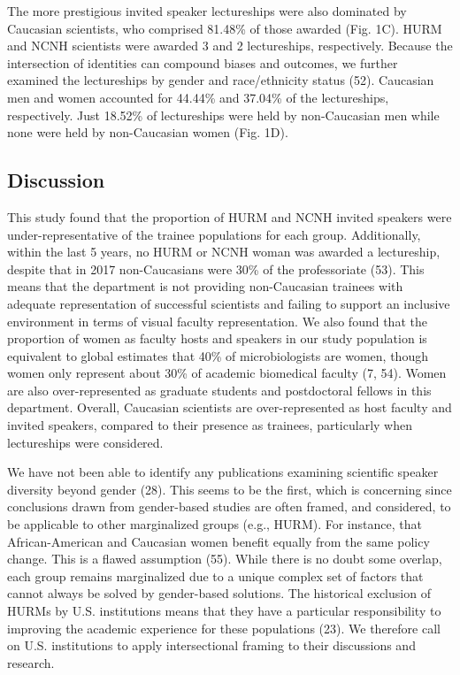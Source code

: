\documentclass[10pt,]{article}
\begin{document}
The more prestigious invited speaker lectureships were also dominated by
Caucasian scientists, who comprised 81.48\% of those awarded (Fig. 1C).
HURM and NCNH scientists were awarded 3 and 2 lectureships,
respectively. Because the intersection of identities can compound biases
and outcomes, we further examined the lectureships by gender and
race/ethnicity status (52). Caucasian men and women accounted for
44.44\% and 37.04\% of the lectureships, respectively. Just 18.52\% of
lectureships were held by non-Caucasian men while none were held by
non-Caucasian women (Fig. 1D).

\subsection{Discussion}\label{discussion}

This study found that the proportion of HURM and NCNH invited speakers
were under-representative of the trainee populations for each group.
Additionally, within the last 5 years, no HURM or NCNH woman was awarded
a lectureship, despite that in 2017 non-Caucasians were 30\% of the
professoriate (53). This means that the department is not providing
non-Caucasian trainees with adequate representation of successful
scientists and failing to support an inclusive environment in terms of
visual faculty representation. We also found that the proportion of
women as faculty hosts and speakers in our study population is
equivalent to global estimates that 40\% of microbiologists are women,
though women only represent about 30\% of academic biomedical faculty
(7, 54). Women are also over-represented as graduate students and
postdoctoral fellows in this department. Overall, Caucasian scientists
are over-represented as host faculty and invited speakers, compared to
their presence as trainees, particularly when lectureships were
considered.

We have not been able to identify any publications examining scientific
speaker diversity beyond gender (28). This seems to be the first, which
is concerning since conclusions drawn from gender-based studies are
often framed, and considered, to be applicable to other marginalized
groups (e.g., HURM). For instance, that African-American and Caucasian
women benefit equally from the same policy change. This is a flawed
assumption (55). While there is no doubt some overlap, each group
remains marginalized due to a unique complex set of factors that cannot
always be solved by gender-based solutions. The historical exclusion of
HURMs by U.S. institutions means that they have a particular
responsibility to improving the academic experience for these
populations (23). We therefore call on U.S. institutions to apply
intersectional framing to their discussions and research.
\end{document}
